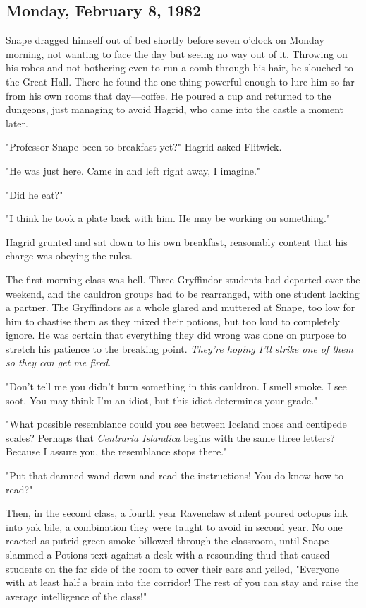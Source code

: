 \subsection{Monday, February 8, 1982}

Snape dragged himself out of bed shortly before seven o'clock on Monday morning, not wanting to face the day but seeing no way out of it. Throwing on his robes and not bothering even to run a comb through his hair, he slouched to the Great Hall. There he found the one thing powerful enough to lure him so far from his own rooms that day—coffee. He poured a cup and returned to the dungeons, just managing to avoid Hagrid, who came into the castle a moment later.

"Professor Snape been to breakfast yet?" Hagrid asked Flitwick.

"He was just here. Came in and left right away, I imagine."

"Did he eat?"

"I think he took a plate back with him. He may be working on something."

Hagrid grunted and sat down to his own breakfast, reasonably content that his charge was obeying the rules.

The first morning class was hell. Three Gryffindor students had departed over the weekend, and the cauldron groups had to be rearranged, with one student lacking a partner. The Gryffindors as a whole glared and muttered at Snape, too low for him to chastise them as they mixed their potions, but too loud to completely ignore. He was certain that everything they did wrong was done on purpose to stretch his patience to the breaking point. \emph{They're hoping I'll strike one of them so they can get me fired.}

"Don't tell me you didn't burn something in this cauldron. I smell smoke. I see soot. You may think I'm an idiot, but this idiot determines your grade."

"What possible resemblance could you see between Iceland moss and centipede scales? Perhaps that \emph{Centraria Islandica} begins with the same three letters? Because I assure you, the resemblance stops there."

"Put that damned wand down and read the instructions! You do know how to read?"

Then, in the second class, a fourth year Ravenclaw student poured octopus ink into yak bile, a combination they were taught to avoid in second year. No one reacted as putrid green smoke billowed through the classroom, until Snape slammed a Potions text against a desk with a resounding thud that caused students on the far side of the room to cover their ears and yelled, "Everyone with at least half a brain into the corridor! The rest of you can stay and raise the average intelligence of the class!"

